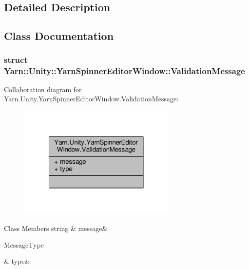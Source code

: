 \subsection{Detailed Description}


\subsection{Class Documentation}
\label{dc/de6/a00167}
\hypertarget{a00085_dc/de6/a00167}{}
\subsubsection{struct Yarn\-:\-:Unity\-:\-:Yarn\-Spinner\-Editor\-Window\-:\-:Validation\-Message}


Collaboration diagram for Yarn.\-Unity.\-Yarn\-Spinner\-Editor\-Window.\-Validation\-Message\-:
\nopagebreak
\begin{figure}[H]
\begin{center}
\leavevmode
\includegraphics[width=224pt]{dd/da7/a00168}
\end{center}
\end{figure}
\begin{DoxyFields}{Class Members}
\hypertarget{a00085_a636dce6708e779c201fa5e7d01cf2955}{string}\label{a00085_a636dce6708e779c201fa5e7d01cf2955}
&
message&
\\
\hline

\hypertarget{a00085_a7d342190c7657fbbe85eb6fa66bcabb8}{Message\-Type}\label{a00085_a7d342190c7657fbbe85eb6fa66bcabb8}
&
type&
\\
\hline

\end{DoxyFields}


